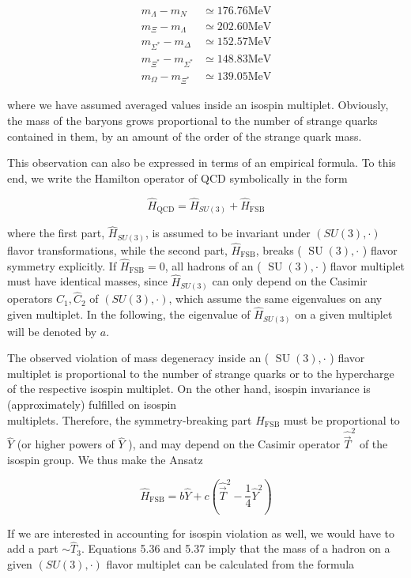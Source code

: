 \documentclass[10pt, letterpaper]{article}
\begin{document}
$$
\begin{aligned}
m_{\Lambda}-m_{N} & \simeq 176.76 \mathrm{MeV} \\
m_{\Xi}-m_{\Lambda} & \simeq 202.60 \mathrm{MeV} \\
m_{\Sigma^{*}}-m_{\Delta} & \simeq 152.57 \mathrm{MeV} \\
m_{\Xi^{*}}-m_{\Sigma^{*}} & \simeq 148.83 \mathrm{MeV} \\
m_{\Omega}-m_{\Xi^{*}} & \simeq 139.05 \mathrm{MeV}
\end{aligned}
$$

where we have assumed averaged values inside an isospin multiplet. Obviously, the mass of the baryons grows proportional to the number of strange quarks contained in them, by an amount of the order of the strange quark mass.

This observation can also be expressed in terms of an empirical formula. To this end, we write the Hamilton operator of QCD symbolically in the form

$$
\hat{H}_{\mathrm{QCD}}=\hat{H}_{S U(3)}+\hat{H}_{\mathrm{FSB}}
$$

where the first part, $\hat{H}_{S U(3)}$, is assumed to be invariant under $(S U(3), \cdot)$ flavor transformations, while the second part, $\hat{H}_{\mathrm{FSB}}$, breaks ( $\operatorname{SU}(3), \cdot$ ) flavor symmetry explicitly. If $\hat{H}_{\mathrm{FSB}}=0$, all hadrons of an ( $\operatorname{SU}(3), \cdot$ ) flavor multiplet must have identical masses, since $\hat{H}_{S U(3)}$ can only depend on the Casimir operators $\hat{C}_{1}, \hat{C}_{2}$ of $(S U(3), \cdot)$, which assume the same eigenvalues on any given multiplet. In the following, the eigenvalue of $\hat{H}_{S U(3)}$ on a given multiplet will be denoted by $a$.

The observed violation of mass degeneracy inside an ( $\operatorname{SU}(3), \cdot$ ) flavor multiplet is proportional to the number of strange quarks or to the hypercharge of the respective isospin multiplet. On the other hand, isospin invariance is (approximately) fulfilled on isospin\\
multiplets. Therefore, the symmetry-breaking part $\hat{H}_{\mathrm{FSB}}$ must be proportional to $\hat{Y}$ (or higher powers of $\hat{Y}$ ), and may depend on the Casimir operator $\hat{\vec{T}}^{2}$ of the isospin group. We thus make the Ansatz

$$
\hat{H}_{\mathrm{FSB}}=b \hat{Y}+c\left(\hat{\vec{T}}^{2}-\frac{1}{4} \hat{Y}^{2}\right)
$$

If we are interested in accounting for isospin violation as well, we would have to add a part $\sim \hat{T}_{3}$. Equations 5.36 and 5.37 imply that the mass of a hadron on a given $(S U(3), \cdot)$ flavor multiplet can be calculated from the formula
\end{document}
